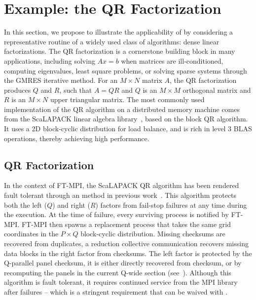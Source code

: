 \section{Example: the QR Factorization}
\label{sec:ftla}

In this section, we propose to illustrate the applicability of \cof by
considering a representative routine of a widely used
class of algorithms: dense linear factorizations. The QR factorization
is a cornerstone building block in many applications, including solving
$Ax=b$ when matrices are ill-conditioned, computing eigenvalues, least
square problems, or solving sparse systems through the GMRES iterative
method. For an $M\times N$ matrix $A$, the QR factorization produces $Q$ and
$R$, such that $A=QR$ and $Q$ is an $M\times M$ orthogonal matrix and
$R$ is an $M\times N$ upper triangular matrix. The most commonly used
implementation of the QR algorithm on a distributed memory machine comes
from the ScaLAPACK linear algebra library~\cite{dongarra1997scalapack},
based on the block QR algorithm. It uses a 2D block-cyclic distribution
for load balance, and is rich in level 3 BLAS operations, thereby
achieving high performance.


\subsection{\abft QR Factorization}

In the context of FT-MPI, the ScaLAPACK QR algorithm has been rendered fault
tolerant through an \abft method in previous work~\cite{pengduppopp12}. This
\abft algorithm protects both the left ($Q$) and right ($R$) factors from fail-stop
failures at any time during the execution.  At the time of failure, every surviving process is notified by FT-MPI. FT-MPI
then spawns a replacement process that takes the same grid coordinates in the
$P\times Q$ block-cyclic distribution. Missing checksums are recovered from
duplicates, a reduction collective communication recovers missing data blocks in
the right factor from checksums. The left factor is protected by the Q-parallel
panel checksum, it is either directly recovered from checksum, or by
recomputing the panels in the current Q-wide section
(see~\cite{pengduppopp12}). Although this algorithm is fault tolerant, it
requires continued service from the MPI library after failures -- which is a
stringent requirement that can be waived with \cof.

